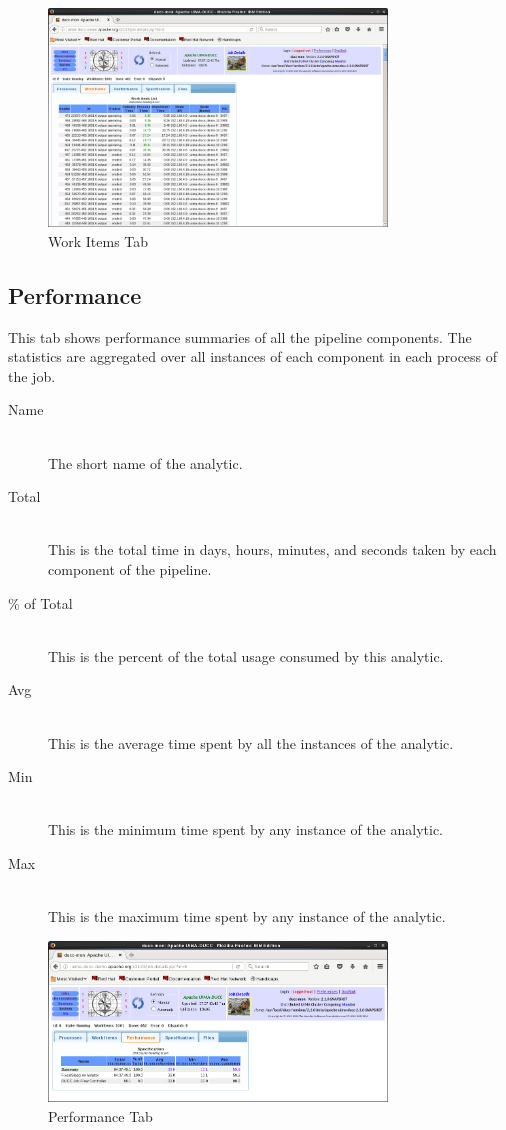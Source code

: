     \begin{figure}[ht!]
    \centering
    \includegraphics[width=90mm]{images/ducc-webserver/Job-Details-WorkItems.png}
    \caption{Work Items Tab}
    \end{figure}  

   \subsection{Performance}
   \label{subsec:performance}
   This tab shows performance summaries of all the pipeline components.  The statistics
   are aggregated over all instances of each component in each process of the job.
   
   \begin{description}
     \item[Name]  \hfill \\
       The short name of the analytic.
     \item[Total]  \hfill \\
       This is the total time in days, hours, minutes, and seconds taken by each
       component of the pipeline.
     \item[\% of Total]  \hfill \\
       This is the percent of the total usage consumed by this analytic.
     \item[Avg]  \hfill \\
       This is the average time spent by all the instances of the analytic.
     \item[Min]  \hfill \\
       This is the minimum time spent by any instance of the analytic.
     \item[Max]  \hfill \\
       This is the maximum time spent by any instance of the analytic.
   \end{description}
    
    \begin{figure}[ht!]
    \centering
    \includegraphics[width=90mm]{images/ducc-webserver/Job-Details-Performance.png}
    \caption{Performance Tab}
    \end{figure}  
       
